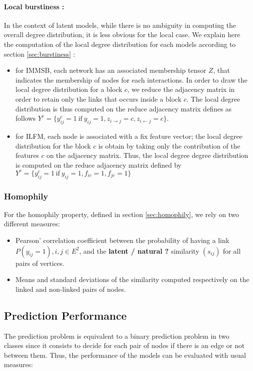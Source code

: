 \documentclass[a4paper, 12pt]{article}
\begin{document}
\paragraph{Local burstiness : }
In the context of latent models, while there is no ambiguity in computing the overall degree distribution, it is less obvious for the local case. We explain here the computation of the local degree distribution for each models according to section \ref{sec:burstiness} :
\begin{itemize}
        \item for IMMSB, each network has an associated membership tensor $Z$, that indicates the membership of nodes for each  interactions. In order to draw the local degree distribution for a block $c$, we reduce the adjacency matrix in order to retain only the links that occurs inside a block $c$. The local degree distribution is thus computed on the reduce adjacency matrix defines as follows $Y^c =\{ y_{ij}^c=1 \ \textrm{if}\ y_{ij}=1 , z_{i\rightarrow j}=c, z_{i\leftarrow j}=c\}$.
        \item for ILFM, each node is associated with a fix feature vector; the local degree distribution for the block $c$ is obtain by taking only the contribution of the features $c$ on the adjacency matrix. Thus, the local degree degree distribution is computed on the reduce adjacency matrix defined by $Y^c =\{ y_{ij}^c=1 \ \textrm{if}\ y_{ij}=1 , f_{ic}=1, f_{jc}=1\}$
\end{itemize}

\subsubsection{Homophily}

For the homophily property, defined in section \ref{sec:homophily}, we rely on two different measures:

\begin{itemize}
    \item  Pearson' correlation coefficient between the probability of having a link $P(y_{ij}=1),  i, j \in E^2 $, and the  \textbf{latent / natural ?} similarity $(s_{ij})$ for all pairs of vertices. 
    \item  Means and standard deviations of the similarity computed respectively on the linked and non-linked pairs of nodes.
\end{itemize}

\subsection{Prediction Performance}
The prediction problem is equivalent to a binary prediction problem in two classes since it consists to decide for each pair of nodes if there is an edge or not between them. 
Thus, the performance of the models can be evaluated with usual measures:
\end{document}
